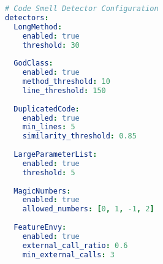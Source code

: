 \documentclass[11pt,a4paper]{article}
\begin{document}
\begin{lstlisting}[language=yaml,caption={Detector Configuration File}]
# Code Smell Detector Configuration
detectors:
  LongMethod:
    enabled: true
    threshold: 30
  
  GodClass:
    enabled: true
    method_threshold: 10
    line_threshold: 150
  
  DuplicatedCode:
    enabled: true
    min_lines: 5
    similarity_threshold: 0.85
  
  LargeParameterList:
    enabled: true
    threshold: 5
  
  MagicNumbers:
    enabled: true
    allowed_numbers: [0, 1, -1, 2]
  
  FeatureEnvy:
    enabled: true
    external_call_ratio: 0.6
    min_external_calls: 3
\end{lstlisting}
\end{document}
